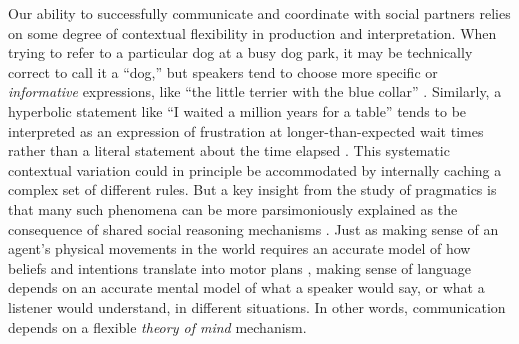 \documentclass[manuscript]{stjour}
\begin{document}

Our ability to successfully communicate and coordinate with social partners relies on some degree of contextual flexibility in production and interpretation. When trying to refer to a particular dog at a busy dog park, it may be technically correct to call it a ``dog,'' but speakers tend to choose more specific or \emph{informative} expressions, like ``the little terrier with the blue collar'' \citep{VanDeemter16_ComputationalModelsOfReferring,GrafEtAl16_BasicLevel,BrennanClark96_ConceptualPactsConversation,DaleReiter95_GriceanRefs}. Similarly, a hyperbolic statement like ``I waited a million years for a table'' tends to be interpreted as an expression of frustration at longer-than-expected wait times rather than a literal statement about the time elapsed \citep{KaoWuBergenGoodman14_NonliteralNumberWords}.  %
This systematic contextual variation could in principle be accommodated by internally caching a complex set of different rules. 
But a key insight from the study of pragmatics is that many such phenomena can be more parsimoniously explained as the consequence of shared social reasoning mechanisms \citep{Grice75_LogicConversation, GoodmanFrank16_RSATiCS}. 
Just as making sense of an agent's physical movements in the world requires an accurate model of how beliefs and intentions translate into motor plans \citep{BakerSaxeTenenbaum09_ActionUnderstandingInversePlanning, JaraEttingerEtAl16_NaiveUtilityCalculus, BakerEtAl17_ToMBayesian}, making sense of language depends on an accurate mental model of what a speaker would say, or what a listener would understand, in different situations. 
In other words, communication depends on a flexible \emph{theory of mind} mechanism.
\end{document}
